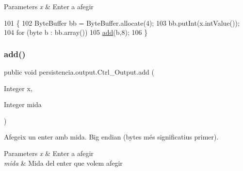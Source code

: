 \begin{DoxyParams}{Parameters}
{\em x} & Enter a afegir \\
\hline
\end{DoxyParams}

\begin{DoxyCode}
101                                \{
102         ByteBuffer bb = ByteBuffer.allocate(4); 
103         bb.putInt(x.intValue());
104         \textcolor{keywordflow}{for} (byte b : bb.array()) 
105             \hyperlink{classpersistencia_1_1output_1_1Ctrl__Output_a8c5aa5a6acb5259faeb1c05c71ddd21c}{add}(b,8);
106     \}
\end{DoxyCode}
\mbox{\label{classpersistencia_1_1output_1_1Ctrl__Output_ac792cc55e30c9c769e10a20c2dd41bc8}} 
\subsubsection{\texorpdfstring{add()}{add()}\hspace{0.1cm}{\footnotesize\ttfamily [5/6]}}
{\footnotesize\ttfamily public void persistencia.\+output.\+Ctrl\+\_\+\+Output.\+add (\begin{DoxyParamCaption}\item[{Integer}]{x,  }\item[{Integer}]{mida }\end{DoxyParamCaption})\hspace{0.3cm}{\ttfamily [inline]}}



Afegeix un enter amb mida. Big endian (bytes més significatius primer). 


\begin{DoxyParams}{Parameters}
{\em x} & Enter a afegir \\
\hline
{\em mida} & Mida del enter que volem afegir \\
\hline
\end{DoxyParams}


